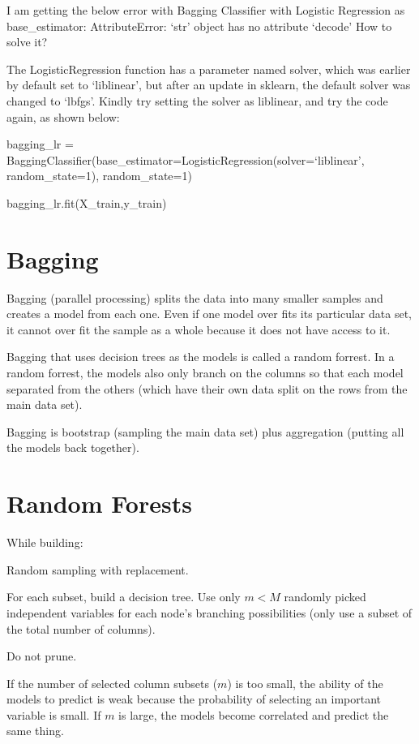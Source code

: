     \begin{qanda}
		\begin{question}I am getting the below error with Bagging Classifier with Logistic Regression as base\_estimator: AttributeError: `str' object has no attribute `decode' How to solve it?\end{question}\begin{answer}
The LogisticRegression function has a parameter named solver, which was earlier by default set to `liblinear', but after an update in sklearn, the default solver was changed to `lbfgs'. Kindly try setting the solver as liblinear, and try the code again, as shown below:

bagging\_lr = BaggingClassifier(base\_estimator=LogisticRegression(solver=`liblinear', random\_state=1), random\_state=1)

bagging\_lr.fit(X\_train,y\_train)
		\end{answer}
    \end{qanda}

	\section{Bagging}
Bagging (parallel processing) splits the data into many smaller samples and creates a model from each one.  Even if one model over fits its particular data set, it cannot over fit the sample as a whole because it does not have access to it.

Bagging that uses decision trees as the models is called a random forrest.  In a random forrest, the models also only branch on the columns so that each model separated from the others (which have their own data split on the rows from the main data set).

Bagging is bootstrap (sampling the main data set) plus aggregation (putting all the models back together).

	\section{Random Forests}
While building:
	\begin{bulletedlist}
		\item Random sampling with replacement.
		\item For each subset, build a decision tree.  Use only $m<M$ randomly picked independent variables for each node's branching possibilities (only use a subset of the total number of columns).
		\item Do not prune.
	\end{bulletedlist}
If the number of selected column subsets ($m$) is too small, the ability of the models to predict is weak because the probability of selecting an important variable is small.  If $m$ is large, the models become correlated and predict the same thing.

